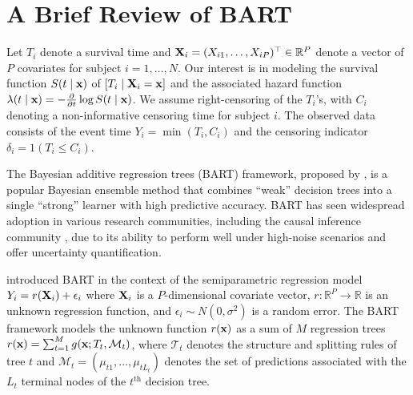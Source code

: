 \documentclass[12pt]{article}
\newcommand{\sM}{\mathcal M}
\newcommand{\Tree}{\mathcal T}
\newcommand{\bfX}{{\bf X}}
\newcommand{\bfx}{{\bf x}}
\begin{document}
\section{A Brief Review of BART}\label{sec:BART}

Let $T_i$ denote a survival time and $\bfX_i = (X_{i1}, \ldots, X_{iP})^{\top} \in \mathbb R^P$ denote a vector of $P$ covariates for subject $i = 1,\ldots,N$. Our interest is in modeling the survival function $S(t \mid \bfx)$ of $[T_i \mid \bfX_i = \bfx]$ and the associated hazard function $\lambda(t \mid \bfx) = - \frac{\partial}{\partial t} \log S(t \mid \bfx)$. We assume right-censoring of the $T_i$'s, with $C_i$ denoting a non-informative censoring time for subject $i$. The observed data consists of the event time $Y_i = \min(T_i, C_i)$ and the censoring indicator $\delta_i = 1(T_i \le C_i)$.

The Bayesian additive regression trees (BART) framework, proposed by \citet{chipman2010bart}, is a popular Bayesian ensemble method that combines ``weak'' decision trees into a single ``strong'' learner with high predictive accuracy. BART has seen widespread adoption in various research communities, including the causal inference community \citep{dorie2019automated}, due to its ability to perform well under high-noise scenarios and offer uncertainty quantification.

\citet{chipman2010bart} introduced BART in the context of the semiparametric regression model $Y_i = r(\bfX_i) + \epsilon_i$ where $\bfX_i$ is a $P$-dimensional covariate vector, $r: \mathbb{R}^P \to \mathbb{R}$ is an unknown regression function, and $\epsilon_i \sim N(0, \sigma^2)$ is a random error. The BART framework models the unknown function $r(\bfx)$ as a sum of $M$ regression trees $r(\bfx) = \sum_{t = 1}^M g(\bfx; \mathcal \Tree_t, \sM_t)$, where $\Tree_t$ denotes the structure and splitting rules of tree $t$ and $\sM_t = (\mu_{t1}, \ldots, \mu_{tL_t})$ denotes the set of predictions associated with the $L_t$ terminal nodes of the $t^{\text{th}}$ decision tree.
\end{document}
